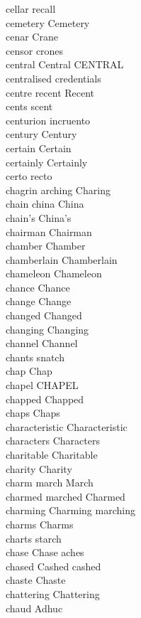 cellar recall\\
cemetery Cemetery\\
cenar Crane\\
censor crones\\
central Central CENTRAL\\
centralised credentials\\
centre recent Recent\\
cents scent\\
centurion incruento\\
century Century\\
certain Certain\\
certainly Certainly\\
certo recto\\
chagrin arching Charing\\
chain china China\\
chain's China's\\
chairman Chairman\\
chamber Chamber\\
chamberlain Chamberlain\\
chameleon Chameleon\\
chance Chance\\
change Change\\
changed Changed\\
changing Changing\\
channel Channel\\
chants snatch\\
chap Chap\\
chapel CHAPEL\\
chapped Chapped\\
chaps Chaps\\
characteristic Characteristic\\
characters Characters\\
charitable Charitable\\
charity Charity\\
charm march March\\
charmed marched Charmed\\
charming Charming marching\\
charms Charms\\
charts starch\\
chase Chase aches\\
chased Cashed cashed\\
chaste Chaste\\
chattering Chattering\\
chaud Adhuc\\
